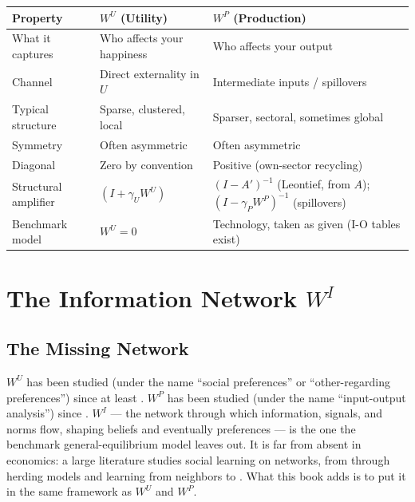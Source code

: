 \documentclass[../structural_economics_book.tex]{subfiles}
\begin{document}
\begin{center}
\begin{tabular}{l >{\raggedright}p{3.5cm} >{\raggedright\arraybackslash}p{3.5cm}}
\toprule
\textbf{Property} & $W^U$ (Utility) & $W^P$ (Production) \\
\midrule
What it captures & Who affects your happiness & Who affects your output \\
Channel & Direct externality in $U$ & Intermediate inputs / spillovers \\
Typical structure & Sparse, clustered, local & Sparser, sectoral, sometimes global \\
Symmetry & Often asymmetric & Often asymmetric \\
Diagonal & Zero by convention & Positive (own-sector recycling) \\
Structural amplifier & $(I + \gamma_U W^U)$ & $(I - A')^{-1}$ (Leontief, from $A$); $(I - \gamma_P W^P)^{-1}$ (spillovers) \\
Benchmark model & $W^U = 0$ & Technology, taken as given (I-O tables exist) \\
\bottomrule
\end{tabular}
\end{center}


\section{The Information Network $W^I$}
\label{ch05:sec:WI}

\subsection{The Missing Network}

$W^U$ has been studied (under the name ``social preferences'' or ``other-regarding preferences'') since at least \citet{becker1974theory}. $W^P$ has been studied (under the name ``input-output analysis'') since \citet{leontief1941structure}. $W^I$ --- the network through which information, signals, and norms flow, shaping beliefs and eventually preferences --- is the one the benchmark general-equilibrium model leaves out. It is far from absent in economics: a large literature studies social learning on networks, from \citet{degroot1974reaching} through herding models \citep{banerjee1992simple} and learning from neighbors \citep{bala1998learning} to \citet{golub2010naive}. What this book adds is to put it in the same framework as $W^U$ and $W^P$.
\end{document}

